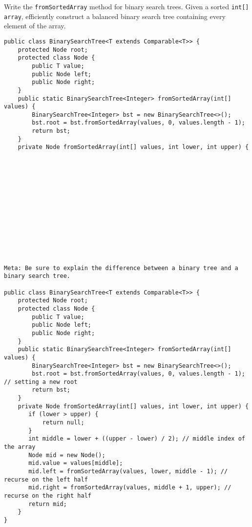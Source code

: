 \question Write the \texttt{fromSortedArray} method for binary search trees. Given a sorted \texttt{int[] array}, efficiently construct a balanced binary search tree containing every element of the array.

\ifprintanswers
\else
\begin{lstlisting}
public class BinarySearchTree<T extends Comparable<T>> {
    protected Node root;
    protected class Node {
        public T value;
        public Node left;
        public Node right;
    }
    public static BinarySearchTree<Integer> fromSortedArray(int[] values) {
        BinarySearchTree<Integer> bst = new BinarySearchTree<>();
        bst.root = bst.fromSortedArray(values, 0, values.length - 1);
        return bst;
    }
    private Node fromSortedArray(int[] values, int lower, int upper) {














\end{lstlisting}
\fi

\begin{solution}
\begin{lstlisting}
Meta: Be sure to explain the difference between a binary tree and a binary search tree.

public class BinarySearchTree<T extends Comparable<T>> {
    protected Node root;
    protected class Node {
        public T value;
        public Node left;
        public Node right;
    }
    public static BinarySearchTree<Integer> fromSortedArray(int[] values) {
        BinarySearchTree<Integer> bst = new BinarySearchTree<>();
        bst.root = bst.fromSortedArray(values, 0, values.length - 1); // setting a new root
        return bst;
    }
    private Node fromSortedArray(int[] values, int lower, int upper) {
       if (lower > upper) {
           return null;
       }
       int middle = lower + ((upper - lower) / 2); // middle index of the array
       Node mid = new Node();
       mid.value = values[middle];
       mid.left = fromSortedArray(values, lower, middle - 1); // recurse on the left half
       mid.right = fromSortedArray(values, middle + 1, upper); // recurse on the right half
       return mid;
    }
}
\end{lstlisting}
\end{solution}